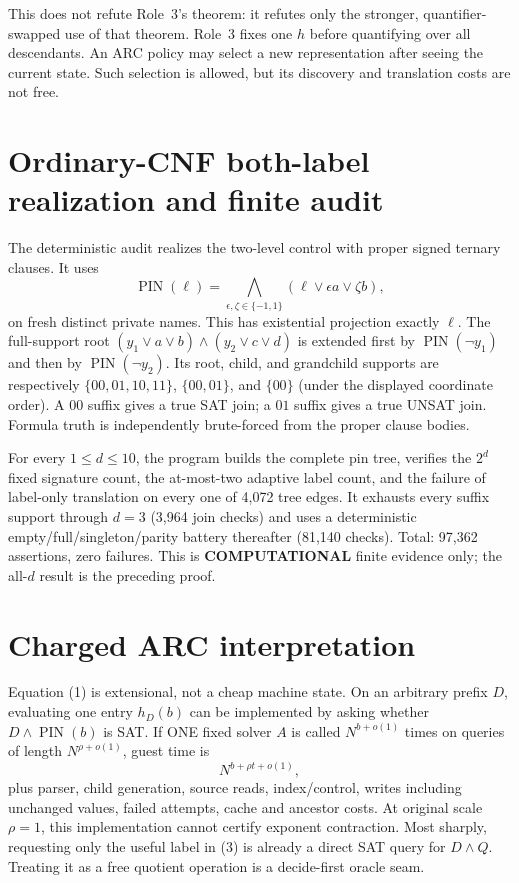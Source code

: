 \documentclass[11pt]{article}
\begin{document}
This does not refute Role~3's theorem: it refutes only the stronger,
quantifier-swapped use of that theorem.  Role~3 fixes one $h$ before
quantifying over all descendants.  An ARC policy may select a new
representation after seeing the current state.  Such selection is allowed,
but its discovery and translation costs are not free.

\section{Ordinary-CNF both-label realization and finite audit}
The deterministic audit realizes the two-level control with proper signed
ternary clauses.  It uses
\[
 \operatorname{PIN}(\ell)=
 \bigwedge_{\epsilon,\zeta\in\{-1,1\}}
 (\ell\vee\epsilon a\vee\zeta b),                         \tag{4}
\]
on fresh distinct private names.  This has existential projection exactly
$\ell$.  The full-support root
$(y_1\vee a\vee b)\wedge(y_2\vee c\vee d)$ is extended first by
$\operatorname{PIN}(\neg y_1)$ and then by
$\operatorname{PIN}(\neg y_2)$.  Its root, child, and grandchild supports
are respectively $\{00,01,10,11\}$, $\{00,01\}$, and $\{00\}$ (under the
displayed coordinate order).  A $00$ suffix gives a true SAT join; a $01$
suffix gives a true UNSAT join.  Formula truth is independently brute-forced
from the proper clause bodies.

For every $1\le d\le10$, the program builds the complete pin tree, verifies
the $2^d$ fixed signature count, the at-most-two adaptive label count, and
the failure of label-only translation on every one of 4,072 tree edges.
It exhausts every suffix support through $d=3$ (3,964 join checks) and uses a
deterministic empty/full/singleton/parity battery thereafter (81,140 checks).
Total: 97,362 assertions, zero failures.  This is \textbf{COMPUTATIONAL}
finite evidence only; the all-$d$ result is the preceding proof.

\section{Charged ARC interpretation}
Equation (1) is extensional, not a cheap machine state.  On an arbitrary
prefix $D$, evaluating one entry $h_D(b)$ can be implemented by asking
whether $D\wedge\operatorname{PIN}(b)$ is SAT.  If ONE fixed solver $A$
is called $N^{b+o(1)}$ times on queries of length $N^{\rho+o(1)}$, guest
time is
\[
 N^{b+\rho t+o(1)},                                      \tag{5}
\]
plus parser, child generation, source reads, index/control, writes including
unchanged values, failed attempts, cache and ancestor costs.  At original
scale $\rho=1$, this implementation cannot certify exponent contraction.
Most sharply, requesting only the useful label in (3) is already a direct
SAT query for $D\wedge Q$.  Treating it as a free quotient operation is a
decide-first oracle seam.
\end{document}
